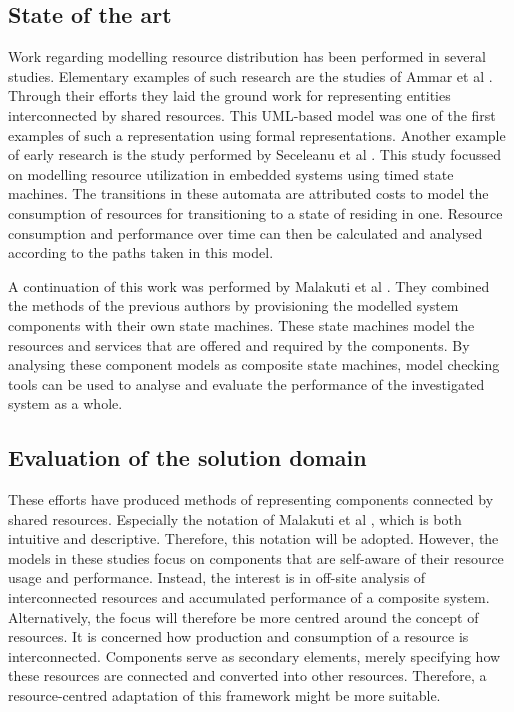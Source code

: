 \subsection{State of the art}
Work regarding modelling resource distribution has been performed in several studies. Elementary examples of such research are the studies of Ammar et al \cite{rum_basis_2}. Through their efforts they laid the ground work for representing entities interconnected by shared resources. This UML-based model was one of the first examples of such a representation using formal representations. Another example of early research is the study performed by Seceleanu et al \cite{rum_basis_89}. This study focussed on modelling resource utilization in embedded systems using timed state machines. The transitions in these automata are attributed costs to model the consumption of resources for transitioning to a state of residing in one. Resource consumption and performance over time  can then be calculated and analysed according to the paths taken in this model.

A continuation of this work was performed by Malakuti et al \cite{steven_te_brinke}. They combined the methods of the previous authors by provisioning the modelled system components with their own state machines. These state machines model the resources and services that are offered and required by the components. By analysing these component models as composite state machines, model checking tools can be used to analyse and evaluate the performance of the investigated system as a whole.

\subsection{Evaluation of the solution domain}
These efforts have produced methods of representing components connected by shared resources. Especially the notation of Malakuti et al \cite{steven_te_brinke}, which is both intuitive and descriptive. Therefore, this notation will be adopted. However, the models in these studies focus on components that are self-aware of their resource usage and performance. Instead, the interest is in off-site analysis of interconnected resources and accumulated performance of a composite system. Alternatively, the focus will therefore be more centred around the concept of resources. It is concerned how production and consumption of a resource is interconnected. Components serve as secondary elements, merely specifying how these resources are connected and converted into other resources. Therefore, a resource-centred adaptation of this framework might be more suitable.

